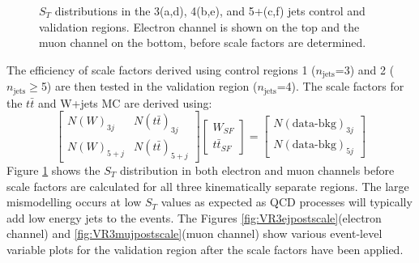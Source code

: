 \begin{figure}[h!]
\hfil  
{}
\caption{$S_T$ distributions in the 3(a,d), 4(b,e), and 5+(c,f) jets control and validation regions. Electron channel is shown on the top and the muon channel on the bottom, before scale factors are determined.}
\label{fig:CRSTs}
\end{figure}

The efficiency of scale factors derived using control regions 1 ($n_{\text{jets}}$=3) and 2 ($n_{\text{jets}}\geq$5) are then tested in the validation region ($n_{\text{jets}}$=4).  The scale factors for the $t\bar{t}$ and W+jets MC are derived using:
\[ 
\begin{bmatrix}  
N(W)_{3j} & N(t\bar{t})_{3j} \\ N(W)_{5+j} & N(t\bar{t})_{5+j} \end{bmatrix} \begin{bmatrix} W_{SF} \\ t\bar{t}_{SF} \end{bmatrix} =
 \begin{bmatrix} N(\text{data-bkg})_{3j} \\N(\text{data-bkg})_{5j} \end{bmatrix}
\]
Figure \ref{fig:CRSTs} shows the $S_T$ distribution in both electron and muon channels before scale factors are calculated for all three kinematically separate regions.  The large mismodelling occurs at low $S_T$ values as expected as QCD processes will typically add low energy jets to the events.  The  Figures \ref{fig:VR3ejpostscale}(electron channel) and \ref{fig:VR3mujpostscale}(muon channel) show various event-level variable plots for the validation region after the scale factors have been applied.

